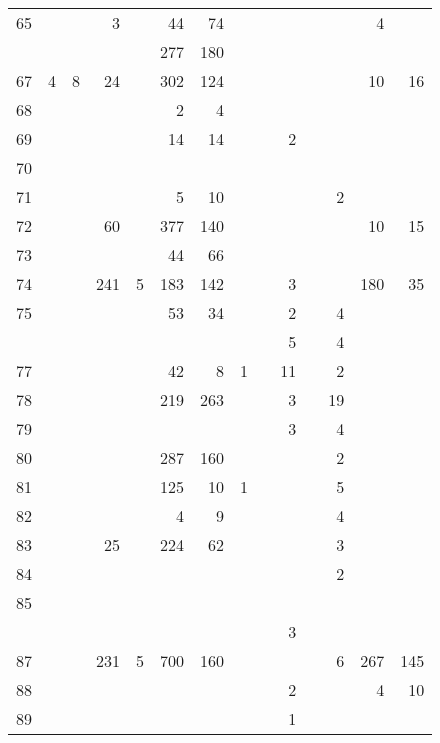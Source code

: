 \documentclass[
]{article}
\begin{document}
\begin{longtable}[l]{rrrrrrrrrrrrrr}
\rowcolor{lightgray}  65 &  &  & 3 &  & 44 & 74 &  &  &  &  &  & 4 & \\
\addlinespace
66 &  &  &  &  & 277 & 180 &  &  &  &  &  &  & \\
\rowcolor{lightgray}  67 & 4 & 8 & 24 &  & 302 & 124 &  &  &  &  &  & 10 & 16\\
68 &  &  &  &  & 2 & 4 &  &  &  &  &  &  & \\
\rowcolor{lightgray}  69 &  &  &  &  & 14 & 14 &  &  & 2 &  &  &  & \\
70 &  &  &  &  &  &  &  &  &  &  &  &  & \\
\addlinespace
\rowcolor{lightgray}  71 &  &  &  &  & 5 & 10 &  &  &  &  & 2 &  & \\
72 &  &  & 60 &  & 377 & 140 &  &  &  &  &  & 10 & 15\\
\rowcolor{lightgray}  73 &  &  &  &  & 44 & 66 &  &  &  &  &  &  & \\
74 &  &  & 241 & 5 & 183 & 142 &  &  & 3 &  &  & 180 & 35\\
\rowcolor{lightgray}  75 &  &  &  &  & 53 & 34 &  &  & 2 &  & 4 &  & \\
\addlinespace
76 &  &  &  &  &  &  &  &  & 5 &  & 4 &  & \\
\rowcolor{lightgray}  77 &  &  &  &  & 42 & 8 & 1 &  & 11 &  & 2 &  & \\
78 &  &  &  &  & 219 & 263 &  &  & 3 &  & 19 &  & \\
\rowcolor{lightgray}  79 &  &  &  &  &  &  &  &  & 3 &  & 4 &  & \\
80 &  &  &  &  & 287 & 160 &  &  &  &  & 2 &  & \\
\addlinespace
\rowcolor{lightgray}  81 &  &  &  &  & 125 & 10 & 1 &  &  &  & 5 &  & \\
82 &  &  &  &  & 4 & 9 &  &  &  &  & 4 &  & \\
\rowcolor{lightgray}  83 &  &  & 25 &  & 224 & 62 &  &  &  &  & 3 &  & \\
84 &  &  &  &  &  &  &  &  &  &  & 2 &  & \\
\rowcolor{lightgray}  85 &  &  &  &  &  &  &  &  &  &  &  &  & \\
\addlinespace
86 &  &  &  &  &  &  &  &  & 3 &  &  &  & \\
\rowcolor{lightgray}  87 &  &  & 231 & 5 & 700 & 160 &  &  &  &  & 6 & 267 & 145\\
88 &  &  &  &  &  &  &  &  & 2 &  &  & 4 & 10\\
\rowcolor{lightgray}  89 &  &  &  &  &  &  &  &  & 1 &  &  &  & \\

\end{longtable}
\end{document}
